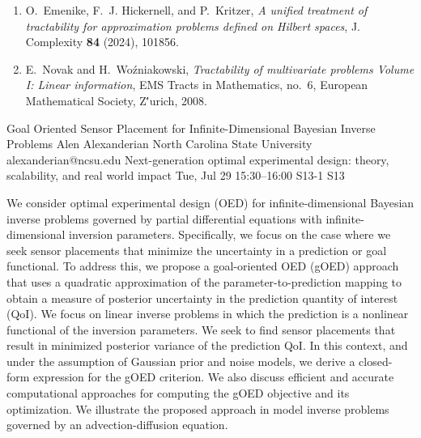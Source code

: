 \begin{talk}
\begin{enumerate}
 \item
O.~Emenike, F.~J. Hickernell, and P.~Kritzer, \emph{A unified treatment of tractability for approximation problems defined on {H}ilbert spaces}, J. Complexity \textbf{84} (2024), 101856.

\item 
E.~Novak and H.~Wo{\'{z}}niakowski, \emph{Tractability of multivariate problems {V}olume {I}: {L}inear information}, EMS Tracts in Mathematics, no.~6, European Mathematical Society, Z\''urich, 2008.

\end{enumerate}


\end{talk}

\begin{talk}
  {Goal Oriented Sensor Placement for Infinite-Dimensional Bayesian Inverse Problems}%
  {Alen Alexanderian}%
  {North Carolina State University}%
  {alexanderian@ncsu.edu}%
  {Next-generation optimal experimental design: theory, scalability, and real world impact}%
  {}%
  {Tue, Jul 29 15:30–16:00}%
  {S13-1}%
  {S13}%
				
			
We consider optimal experimental design (OED) for infinite-dimensional Bayesian
inverse problems governed by partial differential equations with
infinite-dimensional inversion parameters.  Specifically, we focus on the case
where we seek sensor placements that minimize the uncertainty in a prediction or
goal functional.  To address this, we propose a goal-oriented OED (gOED)
approach that uses a quadratic approximation of the parameter-to-prediction
mapping to obtain a measure of posterior uncertainty in the prediction quantity
of interest (QoI).  We focus on linear inverse problems in which the prediction
is a nonlinear functional of the inversion parameters. We seek to find sensor
placements that result in minimized posterior variance of the prediction QoI. In
this context, and under the assumption of Gaussian prior and noise models, we
derive a closed-form expression for the gOED criterion. We also discuss
efficient and accurate computational approaches for computing the gOED objective
and its optimization.  We illustrate the proposed approach in model inverse
problems governed by an advection-diffusion equation.

\medskip

\end{talk}

